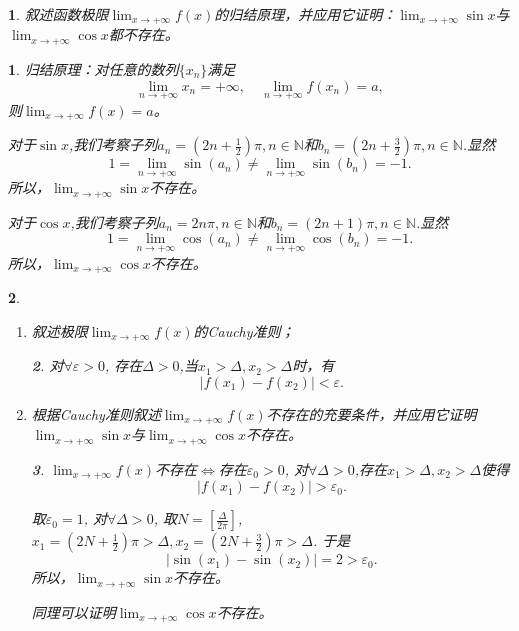 \documentclass[utf8]{book}
\newtheorem{example}{}[section]             %
\newtheorem{solution}{}
\begin{document}
\begin{example}
叙述函数极限$\displaystyle\lim_{x\to +\infty}f(x)$的归结原理，并应用它证明：$\displaystyle\lim_{x\to +\infty}\sin{x}$与$\displaystyle\lim_{x\to +\infty}\cos{x}$都不存在。
\end{example}
\begin{solution}归结原理：对任意的数列$\{x_n\}$满足$$\displaystyle\lim_{n\to +\infty}x_n=+\infty, \quad \displaystyle\lim_{n\to +\infty}f(x_n)=a,$$
则$\displaystyle\lim_{x\to +\infty}f(x)=a$。

对于$\sin{x}$,我们考察子列$a_n = (2n+\frac{1}{2})\pi, n\in \mathbb{N}$和$b_n=(2n+\frac{3}{2})\pi, n\in \mathbb{N}$.显然$$1=\displaystyle\lim_{n\to +\infty}\sin(a_n)\neq \displaystyle\lim_{n\to +\infty}\sin(b_n)=-1.$$
所以，$\displaystyle\lim_{x\to +\infty}\sin{x}$不存在。

对于$\cos{x}$,我们考察子列$a_n = 2n\pi, n\in \mathbb{N}$和$b_n=(2n+1)\pi, n\in \mathbb{N}$.显然$$1=\displaystyle\lim_{n\to +\infty}\cos(a_n)\neq \displaystyle\lim_{n\to +\infty}\cos(b_n)=-1.$$
所以，$\displaystyle\lim_{x\to +\infty}\cos{x}$不存在。
\end{solution}
\begin{example}
\renewcommand\labelenumi{\normalfont(\theenumi)}
\begin{enumerate}
\item 叙述极限$\displaystyle\lim_{x\to +\infty}f(x)$的Cauchy准则；
\begin{solution}
对$\forall \varepsilon >0$, 存在$\Delta > 0$,当$x_1>\Delta, x_2>\Delta$时，有$$|f(x_1)-f(x_2)| < \varepsilon.$$
\end{solution}
\item 根据Cauchy准则叙述$\displaystyle\lim_{x\to +\infty}f(x)$不存在的充要条件，并应用它证明$\displaystyle\lim_{x\to +\infty}\sin{x}$与$\displaystyle\lim_{x\to +\infty}\cos{x}$不存在。
\begin{solution}
$\displaystyle\lim_{x\to +\infty}f(x)$不存在$\iff$存在$\varepsilon_0 > 0$, 
对$\forall \Delta > 0$,存在$x_1 > \Delta, x_2>\Delta$使得
$$|f(x_1)-f(x_2)| > \varepsilon_0.$$

取$\varepsilon_0 = 1$, 对$\forall \Delta>0$, 取$N = \left[\displaystyle\frac{\Delta}{2\pi}\right]$, $x_1 = (2N+\frac{1}{2})\pi > \Delta, x_2 = (2N+\frac{3}{2})\pi > \Delta$.
于是$$|\sin(x_1) -\sin(x_2)| = 2 >\varepsilon_0.$$
所以，$\displaystyle\lim_{x\to +\infty}\sin{x}$不存在。

同理可以证明$\displaystyle\lim_{x\to +\infty}\cos{x}$不存在。
\end{solution}
\end{enumerate}
\end{example}
\end{document}

